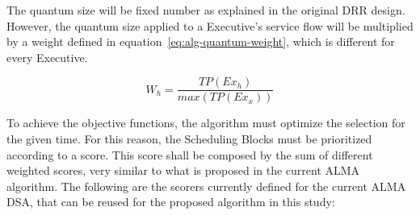The quantum size will be fixed number as explained in the original DRR design. However, the quantum size applied to a Executive's service flow will be multiplied by a weight defined in equation~\ref{eq:alg-quantum-weight}, which is different for every Executive.

\begin{equation}
\label{eq:alg-quantum-weight}
W_{h} = \frac{TP(Ex_h)}{max(TP(Ex_x))}
\end{equation}

To achieve the objective functions, the algorithm must optimize the selection for the given time. For this reason, the Scheduling Blocks must be prioritized according to a score. This score shall be composed by the sum of different weighted scores, very similar to what is proposed in the current ALMA algorithm. The following are the scorers currently defined for the current ALMA DSA, that can be reused for the proposed algorithm in this study:

